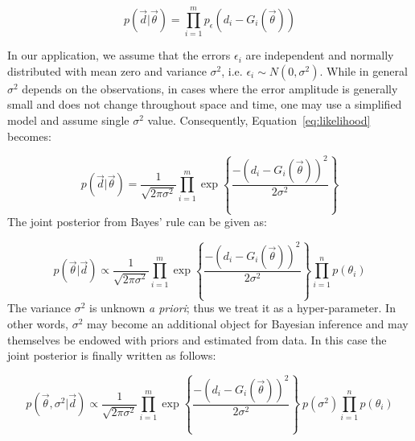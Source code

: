 \begin{equation} 
p(\vec d |  \vec{\theta}) 
= 
\prod_{i=1}^m  
p_\epsilon (d_i - G_i(\vec \theta))  	
\label{eq:likelihood}
\end{equation}

In our application, we assume that the errors $\epsilon_i$ are independent
and normally distributed with mean
zero and variance $\sigma^2$, i.e. 
$\epsilon_i \sim N(0,\sigma^2)$. 
While in general $\sigma^2$ depends on the observations, in cases where the error
amplitude is generally small and does not change throughout space and time, one may use
a simplified model and assume single $\sigma^2$ value.
Consequently, Equation~\eqref{eq:likelihood} becomes:

\begin{equation} 
p(\vec d |  \vec{\theta}) 
= 
\frac{1}{\sqrt{2 \pi \sigma^2}}\prod_{i=1}^m   
\exp \left\lbrace \frac{-(d_i - G_i(\vec \theta))^2}{2 \sigma^2} \right\rbrace 	
\label{eq:likelihood2}
\end{equation}
The joint posterior from Bayes' rule can be given as:

\begin{equation} 
p(\vec{\theta}| \vec d)
\propto
\frac{1}{\sqrt{2 \pi \sigma^2}}   \prod_{i=1}^m  
\exp \left\lbrace \frac{-(d_i - G_i(\vec \theta))^2}{2 \sigma^2} \right\rbrace  
\prod_{i=1}^n p(\theta_i)
\end{equation}
The variance $\sigma^2$ is unknown \emph{a priori}; thus we treat it as a hyper-parameter.
In other words, $\sigma^2$ may become an additional object for Bayesian inference and may themselves be endowed with priors and estimated from data. In this case the joint posterior is finally written as follows:

\begin{equation} 
p(\vec{\theta},\sigma^2 | \vec d)
\propto
\frac{1}{\sqrt{2 \pi \sigma^2}}   \prod_{i=1}^m  
\exp \left\lbrace \frac{-(d_i - G_i(\vec \theta))^2}{2 \sigma^2} \right\rbrace
\ p(\sigma^2) \prod_{i=1}^n p(\theta_i)
\label{eq:post}
\end{equation}

